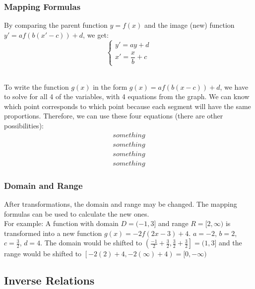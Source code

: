 \documentclass{article}
\begin{document}
	\subsubsection{Mapping Formulas}
	By comparing the parent function $y=f(x)$ and the image (new) function $y'=af(b(x'-c))+d$, we get:
	\[\begin{cases} 
	y'=ay+d\\
	x'=\dfrac{x}{b}+c
	\end{cases}\]
	\\
	To write the function $g(x)$ in the form $g(x)=af(b(x-c))+d$, we have to solve for all 4 of the variables, with 4 equations from the graph. We can know which point corresponds to which point because each segment will have the same proportions. Therefore, we can use these four equations (there are other possibilities):
	\begin{align*}
		something\\something\\something\\something
	\end{align*}
	\subsubsection{Domain and Range}
	After transformations, the domain and range may be changed. The mapping formulas can be used to calculate the new ones.\\
	For example: A function with domain $D=(-1,3]$ and range $R=[2,\infty)$ is transformed into a new function $g(x)=-2f(2x-3)+4$. $a=-2$, $b=2$, $c=\frac{3}{2}$, $d=4$. The domain would be shifted to $\left(\frac{-1}{2}+\frac{3}{2}, \frac{3}{2}+\frac{3}{2}\right]=(1,3]$ and the range would be shifted to $\left[-2(2)+4, -2(\infty)+4\right)=[0, -\infty)$
	\subsection{Inverse Relations}
\end{document}
